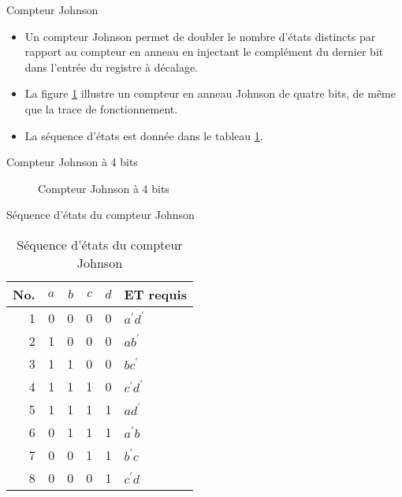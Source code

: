 \documentclass[presentation]{beamer}
\begin{document}
\begin{frame}[label={sec:org3be006e}]{Compteur Johnson}
\begin{itemize}
\item Un compteur Johnson permet de doubler le nombre d'états distincts par rapport au compteur en anneau en injectant le complément du dernier bit dans l'entrée du registre à décalage.

\item La figure \ref{fig:org0e1e24b} illustre un compteur en anneau Johnson de quatre bits, de même que la trace de fonctionnement.

\item La séquence d'états est donnée dans le tableau \ref{tab:org00365dd}.
\end{itemize}
\end{frame}

\begin{frame}[label={sec:orga9a3ee5}]{Compteur Johnson à 4 bits}
\begin{figure}[htbp]
\centering

\caption{\label{fig:org0e1e24b}Compteur Johnson à 4 bits}
\end{figure}
\end{frame}

\begin{frame}[label={sec:org6eccdf3}]{Séquence d'états du compteur Johnson}
\begin{table}[htbp]
\caption{\label{tab:org00365dd}Séquence d'états du compteur Johnson}
\centering
\begin{tabular}{rrrrrl}
No. & \(a\) & \(b\) & \(c\) & \(d\) & ET requis\\
\hline
1 & 0 & 0 & 0 & 0 & \(a^\prime d^\prime\)\\
2 & 1 & 0 & 0 & 0 & \(a b^\prime\)\\
3 & 1 & 1 & 0 & 0 & \(b c^\prime\)\\
4 & 1 & 1 & 1 & 0 & \(c^\prime d^\prime\)\\
5 & 1 & 1 & 1 & 1 & \(a d^\prime\)\\
6 & 0 & 1 & 1 & 1 & \(a^\prime b\)\\
7 & 0 & 0 & 1 & 1 & \(b^\prime c\)\\
8 & 0 & 0 & 0 & 1 & \(c^\prime d\)\\
\end{tabular}
\end{table}
\end{frame}
\end{document}
